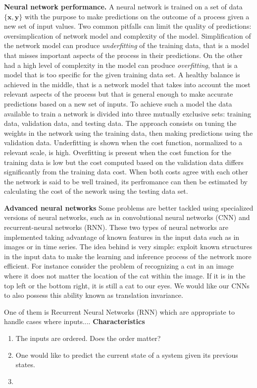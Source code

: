 \documentclass[11pt,onecolumn]{article}
\begin{document}
\textbf{Neural network performance.} A neural network is trained on a set of data $\{\mathbf{x},\mathbf{y}\}$ with the purpose to make predictions on the outcome of a process given a new set of input values. Two common pitfalls can limit the quality of predictions: oversimplication of network model and complexity of the model. Simplification of the network model can produce \textit{underfitting} of the training data, that is a model that misses important aspects of the process in their predictions. On the other had a high level of complexity in the model can produce \textit{overfitting}, that is a model that is too specific for the given training data set. A healthy balance is achieved in the middle, that is a network model that takes into account the most relevant aspects of the process but that is general enough to make accurate predictions based on a new set of inputs. To achieve such a model the data available to train a network is divided into three mutually exclusive sets: training data, validation data, and testing data. The approach consists on tuning the weights in the network using the training data, then making predictions using the validation data. Underfitting is shown when the cost function, normalized to a relevant scale, is high. Overfitting is present when the cost function for the training data is low but the cost computed based on the validation data differs significantly from the training data cost. When both costs agree with each other the network is said to be well trained, its perfromance can then be estimated by calculating the cost of the nework using the testing data set. 

\textbf{Advanced neural networks}
Some problems are better tackled using specialized versions of neural networks, such as in convolutional neural networks (CNN) and recurrent-neural networks (RNN). These two types of neural networks are implemented taking advantage of known features in the input data such as in images or in time series. The idea behind is very simple: exploit known structures in the input data to make the learning and inference process of the network more efficient.
For instance consider the problem of recognizing a cat in an image where it does not matter the location of the cat within the image. If it is in the top left or the bottom right, it is still a cat to our eyes. We would like our CNNs to also possess this ability known as translation invariance.  



One of them is Recurrent Neural Networks (RNN) which are appropriate to handle cases where inputs.... 
\textbf{Characteristics}
\begin{enumerate}
  \item The inputs are ordered. Does the order matter? 
  \item One would like to predict the current state of a system given its previous states. 
  \item 
\end{enumerate}
\end{document}
